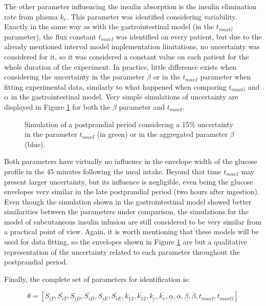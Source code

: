 The other parameter influencing the insulin absorption is the insulin elimination rate from plasma $k_e$. This parameter was identified considering variability. Exactly in the same way as with the gastrointestinal model (in the $t_{maxG}$ parameter), the flux constant $t_{maxI}$ was identified on every patient, but due to the already mentioned interval model implementation limitations, no uncertainty was considered for it, so it was considered a constant value on each patient for the whole duration of the experiment. In practice, little difference exists when considering the uncertainty in the parameter $\beta$ or in the $t_{maxI}$ parameter when fitting experimental data, similarly to what happened when comparing $t_{maxG}$ and $\alpha$ in the gastrointestinal model. Very simple simulations of uncertainty are displayed in Figure \ref{fig:tmaxI_ke_ins} for both the $\beta$ parameter and $t_{maxI}$.

\begin{figure}[hbtp]
\centering
{}\caption{Simulation of a postprandial period considering a 15\% uncertainty in the parameter $t_{maxI}$ (in green) or in the aggregated parameter $\beta$ (blue).}
\label{fig:tmaxI_ke_ins}
\end{figure}

Both parameters have virtually no influence in the envelope width of the glucose profile in the 45 minutes following the meal intake. Beyond that time $t_{maxI}$ may present larger uncertainty, but its influence is negligible, even being the glucose envelopes very similar in the late postprandial period (two hours after ingestion). Even though the simulation shown in the gastrointestinal model showed better similarities between the parameters under comparison, the simulations for the model of subcutaneous insulin infusion are still considered to be very similar from a practical point of view. Again, it is worth mentioning that these models will be used for data fitting, so the envelopes shown in Figure \ref{fig:tmaxI_ke_ins} are but a qualitative representation of the uncertainty related to each parameter throughout the postprandial period.

Finally, the complete set of parameters for identification is:

\begin{equation}\label{eq:parametervectorCGM}
\theta=[ \underline{S_{iT}}, \overline{S_{iT}}, \underline{S_{iD}}, \overline{S_{iD}}, \underline{S_{iE}}, \overline{S_{iE}}, \underline{k_{12}}, \overline{k_{12}}, \underline{k_e}, \overline{k_e}, \underline{\alpha}, \overline{\alpha}, \underline{\beta}, \overline{\beta}, t_{maxI}, t_{maxG} ]
\end{equation}

